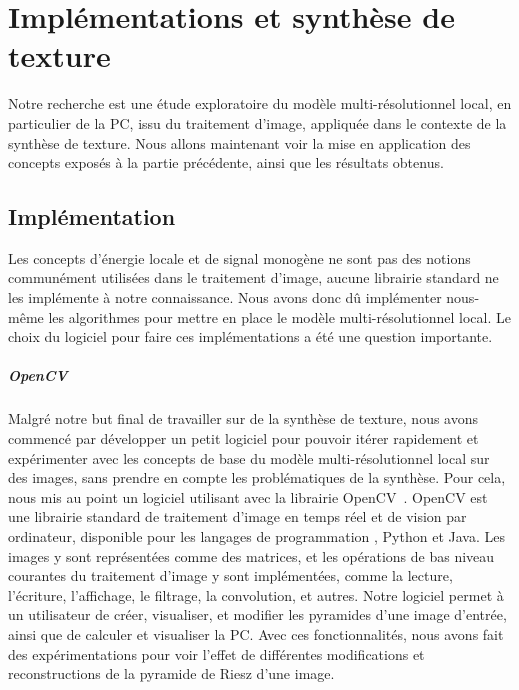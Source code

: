 \chapter{Implémentations et synthèse de texture}
\label{chap:chapitre2}

Notre recherche est une étude exploratoire du modèle multi-résolutionnel local, en particulier de la PC, issu du traitement d'image, appliquée dans le contexte de la synthèse de texture. Nous allons maintenant voir la mise en application des concepts exposés à la partie précédente, ainsi que les résultats obtenus.

\section{Implémentation}

Les concepts d'énergie locale et de signal monogène ne sont pas des notions communément utilisées dans le traitement d'image, aucune librairie standard ne les implémente à notre connaissance. Nous avons donc dû implémenter nous-même les algorithmes pour mettre en place le modèle multi-résolutionnel local. Le choix du logiciel pour faire ces implémentations a été une question importante.


\paragraph{OpenCV}

Malgré notre but final de travailler sur de la synthèse de texture, nous avons commencé par développer un petit logiciel pour pouvoir itérer rapidement et expérimenter avec les concepts de base du modèle multi-résolutionnel local sur des images, sans prendre en compte les problématiques de la synthèse. Pour cela, nous mis au point un logiciel utilisant \cpp avec la librairie OpenCV~\cite{opencv_library}. OpenCV est une librairie standard de traitement d'image en temps réel et de vision par ordinateur, disponible pour les langages de programmation \cpp, Python et Java. Les images y sont représentées comme des matrices, et les opérations de bas niveau courantes du traitement d'image y sont implémentées, comme la lecture, l'écriture, l'affichage, le filtrage, la convolution, et autres. Notre logiciel permet à un utilisateur de créer, visualiser, et modifier les pyramides d'une image d'entrée, ainsi que de calculer et visualiser la PC. Avec ces fonctionnalités, nous avons fait des expérimentations pour voir l'effet de différentes modifications et reconstructions de la pyramide de Riesz d'une image.

